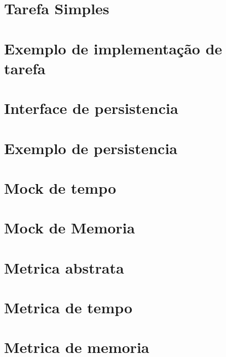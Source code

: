 \documentclass[12pt]{tcc}
\begin{document}
\section{Tarefa Simples}


\section{Exemplo de implementação de tarefa}


\section{Interface de persistencia}


\section{Exemplo de persistencia}


\section{Mock de tempo}


\section{Mock de Memoria}


\section{Metrica abstrata}


\section{Metrica de tempo}


\section{Metrica de memoria}

\end{document}
